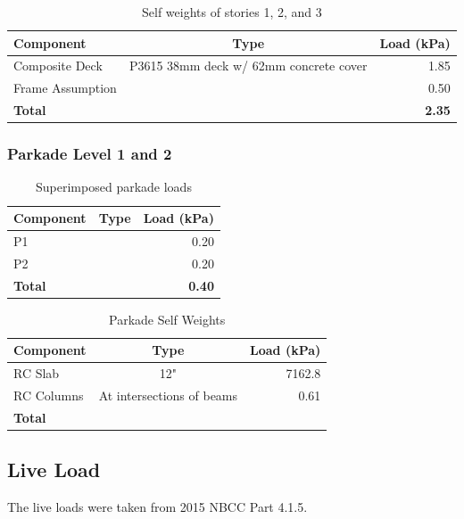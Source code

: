 \documentclass[12pt]{article}
\begin{document}
\begin{table}[h!]
    \centering
    \begin{tabular}{lcr}
        \toprule
        \textbf{Component} & \textbf{Type} & \textbf{Load (kPa)}\\
        \midrule
        Composite Deck & P3615 38mm deck w/ 62mm concrete cover & 1.85\\
        Frame Assumption &  & 0.50\\
        \textbf{Total} & & \textbf{2.35}\\
        \bottomrule
    \end{tabular}
    \caption{Self weights of stories 1, 2, and 3}
    \label{tab:self123}
\end{table}

\subsubsection{Parkade Level 1 and 2}

\begin{table}[h!]
    \centering
    \begin{tabular}{lcr}
        \toprule
        \textbf{Component} & \textbf{Type} & \textbf{Load (kPa)}\\
        \midrule
        P1 &  & 0.20\\
        P2 &  & 0.20\\
        \textbf{Total} & & \textbf{0.40}\\
        \bottomrule
    \end{tabular}
    \caption{Superimposed parkade loads}
    \label{tab:superPark}
\end{table}

\begin{table}[h!]
    \centering
    \begin{tabular}{lcr}
        \toprule
        \textbf{Component} & \textbf{Type} & \textbf{Load (kPa)}\\
        \midrule
        RC Slab & 12" & 7162.8\\
        RC Columns & At intersections of beams & 0.61\\
        \textbf{Total} & & \textbf{}\\
        \bottomrule
    \end{tabular}
    \caption{Parkade Self Weights}
    \label{tab:selfPark}
\end{table}

\subsection{Live Load}
The live loads were taken from 2015 NBCC Part 4.1.5.
\end{document}
